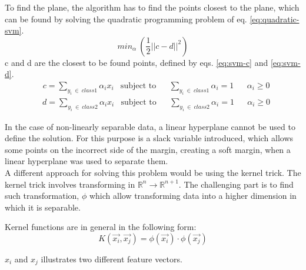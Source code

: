 To find the plane, the algorithm has to find the points closest
to the plane, which can 
be found by solving the quadratic programming problem of eq. \eqref{eq:quadratic-svm}.
\begin{equation}
min_\alpha~\left(\frac{1}{2} ||c-d||^2\right)
\label{eq:quadratic-svm}
\end{equation}
c and d are the closest to be found points,
defined by eqs. \eqref{eq:svm-c} and \eqref{eq:svm-d}.
\begin{equation}
\begin{aligned}
&c = \sum_{y_i~\in~class1} \alpha_ix_i  
& \text{subject to}
&& \sum_{y_i~\in~class1}\alpha_i =1 
&& \alpha_i \geq 0
\end{aligned}
\label{eq:svm-c} 
\end{equation}
\begin{equation}
\begin{aligned}
&d = \sum_{y_i~\in~class2} \alpha_ix_i  
& \text{subject to}
&& \sum_{y_i~\in~class2}\alpha_i =1 
&& \alpha_i \geq 0
\end{aligned} 
\label{eq:svm-d} 
\end{equation}

In the case of non-linearly separable data,
a linear hyperplane cannot be used 
to define the solution. 
For this purpose is a slack variable introduced, which allows some points on the 
incorrect side of the margin, creating a soft margin, when a linear hyperplane 
was used to separate them.\\

A different approach for solving this problem would be using the kernel trick. 
The kernel trick involves transforming in $\mathbb{R}^n \rightarrow 
\mathbb{R}^{n+1}$. 
The challenging part is to find such transformation, $\phi$ which allow 
transforming data into a higher dimension in which it is separable. 

Kernel functions are in general in the following form:
\begin{equation}
K(\overrightarrow{x_i},\overrightarrow{x_j}) = \phi(\overrightarrow{x_i}) \cdot 
\phi(\overrightarrow{x_j}) 
\end{equation}

$x_i$ and $x_j$ illustrates two different feature vectors.

